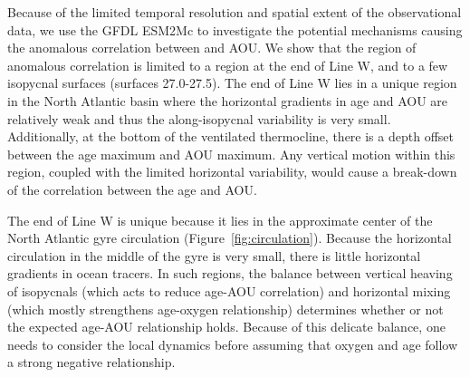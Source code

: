 Because of the limited temporal resolution and spatial extent of the observational
data, we use the GFDL ESM2Mc to investigate the potential mechanisms causing the
anomalous correlation between and AOU. We show that the region of anomalous
correlation is limited to a region at the end of Line W, and to a few isopycnal
surfaces (surfaces 27.0-27.5). The end of Line W lies in a unique region in the
North Atlantic basin where the horizontal gradients in age and AOU are relatively
weak and thus the along-isopycnal variability is very small. Additionally, at the
bottom of the ventilated thermocline, there is a depth offset between the age
maximum and AOU maximum. Any vertical motion within this region, coupled with the
limited horizontal variability, would cause a break-down of the correlation between
the age and AOU.

The end of Line W is unique because it lies in the approximate center of the North
Atlantic gyre circulation (Figure~\ref{fig:circulation}). Because the horizontal
circulation in the middle of the gyre is very small, there is little horizontal
gradients in ocean tracers. In such regions, the balance between vertical heaving
of isopycnals (which acts to reduce age-AOU correlation) and horizontal mixing
(which mostly strengthens age-oxygen relationship) determines whether or not the
expected age-AOU relationship holds. Because of this delicate balance, one needs
to consider the local dynamics before assuming that oxygen and age follow a strong
negative relationship.



%

